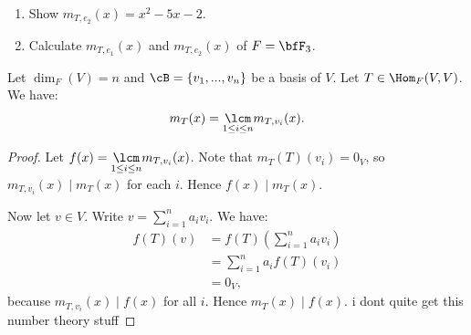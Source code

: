     \begin{exercise}
        \phantom{a}
        \begin{enumerate}
            \item Show $m_{T,e_2}(x) = x^2 - 5x -2$.
            \item Calculate $m_{T,e_1}(x)$ and $m_{T,e_2}(x)$ of $F = \bfF_3$.
        \end{enumerate}
    \end{exercise}

    \begin{theorem}
        Let $\dim_F{(V)} = n$ and $\cB = \{v_1,...,v_n\}$ be a basis of $V$. Let $T \in \Hom_F{(V,V)}$. We have:
            \begin{equation*}
            \begin{split}
                m_T(x) = \underset{1 \leq i \leq n}\lcm m_{T,v_i}(x).
            \end{split}
            \end{equation*}
    \end{theorem}
        \begin{proof}
            Let $f(x) = \underset{1 \leq i \leq n}\lcm m_{T,v_i}(x)$. Note that $m_T(T)(v_i) = 0_V$, so $m_{T,v_i}(x) \mid m_T(x)$ for each $i$. Hence $f(x) \mid m_T(x)$.

            Now let $v \in V$. Write $v = \sum_{i = 1}^n a_i v_i$. We have:
                \begin{equation*}
                \begin{split}
                    f(T)(v)
                    & = f(T)(\sum_{i = 1}^n a_i v_i) \\
                    & = \sum_{i = 1}^n a_i f(T)(v_i) \\
                    & = 0_V,
                \end{split}
                \end{equation*}
            because $m_{T,v_i}(x) \mid f(x)$ for all $i$. Hence $m_T(x)\mid f(x)$. {\color{red} i dont quite get this number theory stuff}
        \end{proof}
    
